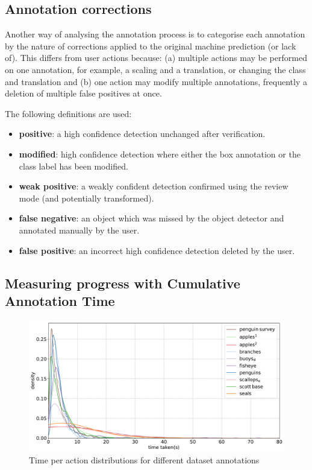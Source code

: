\subsection{Annotation corrections}
\label{sec:corrections}

Another way of analysing the annotation process is to categorise each annotation by the nature of corrections applied to the original machine prediction (or lack of). This differs from user actions because: (a) multiple actions may be performed on one annotation, for example, a scaling and a translation, or changing the class and translation and (b) one action may modify multiple annotations, frequently a deletion of multiple false positives at once.

The following definitions are used:

\begin{itemize}
    \item {\bf positive}: a high confidence detection unchanged after verification.
    \item {\bf modified}: high confidence detection where either the box annotation or the class label has been modified.
    \item {\bf weak positive}: a weakly confident detection confirmed using the review mode (and potentially transformed).    
    \item {\bf false negative}: an object which was missed by the object detector and annotated manually by the user.    
    \item {\bf false positive}: an incorrect high confidence detection deleted by the user.
\end{itemize}

\subsection{Measuring progress with Cumulative Annotation Time}
\label{sec:ann_time}

\begin{figure}[ht!] 
\centering
  \includegraphics[width=1.0\linewidth]{charts/summaries/time_density.pdf}
  \caption{Time per action distributions for different dataset annotations}
  \label{fig:annotation_time_density}
\end{figure}

